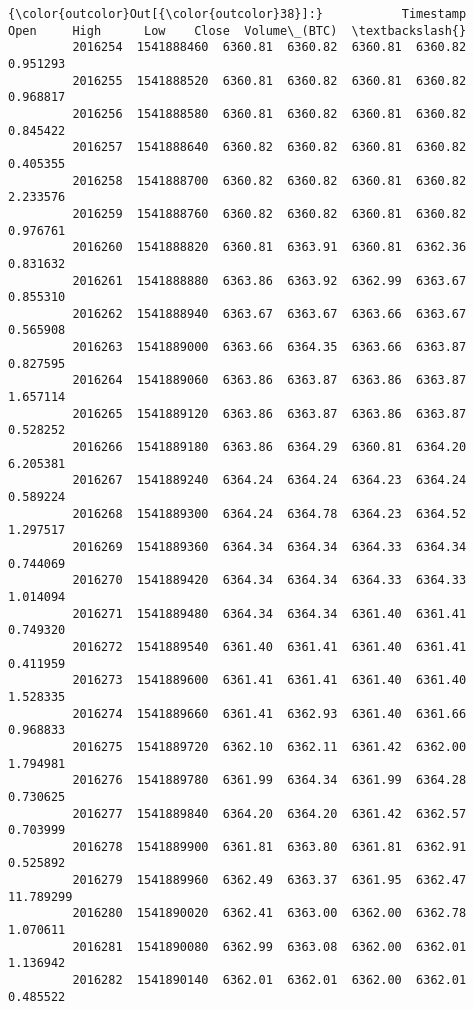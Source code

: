 \documentclass[11pt]{article}
\begin{document}
\begin{Verbatim}[commandchars=\\\{\}]
{\color{outcolor}Out[{\color{outcolor}38}]:}           Timestamp     Open     High      Low    Close  Volume\_(BTC)  \textbackslash{}
         2016254  1541888460  6360.81  6360.82  6360.81  6360.82      0.951293   
         2016255  1541888520  6360.81  6360.82  6360.81  6360.82      0.968817   
         2016256  1541888580  6360.81  6360.82  6360.81  6360.82      0.845422   
         2016257  1541888640  6360.82  6360.82  6360.81  6360.82      0.405355   
         2016258  1541888700  6360.82  6360.82  6360.81  6360.82      2.233576   
         2016259  1541888760  6360.82  6360.82  6360.81  6360.82      0.976761   
         2016260  1541888820  6360.81  6363.91  6360.81  6362.36      0.831632   
         2016261  1541888880  6363.86  6363.92  6362.99  6363.67      0.855310   
         2016262  1541888940  6363.67  6363.67  6363.66  6363.67      0.565908   
         2016263  1541889000  6363.66  6364.35  6363.66  6363.87      0.827595   
         2016264  1541889060  6363.86  6363.87  6363.86  6363.87      1.657114   
         2016265  1541889120  6363.86  6363.87  6363.86  6363.87      0.528252   
         2016266  1541889180  6363.86  6364.29  6360.81  6364.20      6.205381   
         2016267  1541889240  6364.24  6364.24  6364.23  6364.24      0.589224   
         2016268  1541889300  6364.24  6364.78  6364.23  6364.52      1.297517   
         2016269  1541889360  6364.34  6364.34  6364.33  6364.34      0.744069   
         2016270  1541889420  6364.34  6364.34  6364.33  6364.33      1.014094   
         2016271  1541889480  6364.34  6364.34  6361.40  6361.41      0.749320   
         2016272  1541889540  6361.40  6361.41  6361.40  6361.41      0.411959   
         2016273  1541889600  6361.41  6361.41  6361.40  6361.40      1.528335   
         2016274  1541889660  6361.41  6362.93  6361.40  6361.66      0.968833   
         2016275  1541889720  6362.10  6362.11  6361.42  6362.00      1.794981   
         2016276  1541889780  6361.99  6364.34  6361.99  6364.28      0.730625   
         2016277  1541889840  6364.20  6364.20  6361.42  6362.57      0.703999   
         2016278  1541889900  6361.81  6363.80  6361.81  6362.91      0.525892   
         2016279  1541889960  6362.49  6363.37  6361.95  6362.47     11.789299   
         2016280  1541890020  6362.41  6363.00  6362.00  6362.78      1.070611   
         2016281  1541890080  6362.99  6363.08  6362.00  6362.01      1.136942   
         2016282  1541890140  6362.01  6362.01  6362.00  6362.01      0.485522   

\end{Verbatim}
\end{document}
